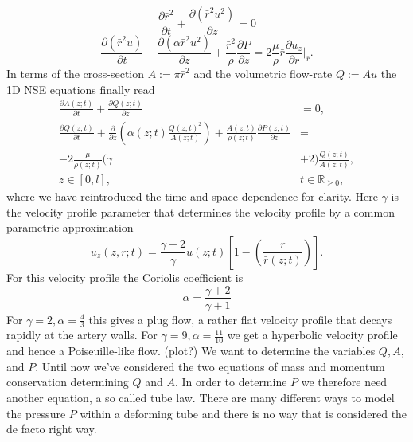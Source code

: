 \documentclass[a4paper, oneside]{discothesis}
\begin{document}
\begin{equation}
	\frac{\partial \bar{r}^2}{\partial t} + \frac{\partial (\bar{r}^2 u^2)}{\partial z} = 0
\end{equation}
\begin{equation}
	\frac{\partial (\bar{r}^2 u)}{\partial t} + \frac{\partial (\alpha \bar{r}^2 u^2) }{\partial z} + \frac{\bar{r}^2}{\rho} \frac{\partial P}{\partial z} = 2 \frac{\mu}{\rho} \bar{r} \frac{\partial u_z}{\partial r} |_{\bar{r}}.
\end{equation}
In terms of the cross-section $A := \pi \bar{r}^2$ and the volumetric flow-rate $Q := Au$ the 1D NSE equations finally read
\begin{equation}
	\begin{aligned} 
		\frac{\partial A(z;t)}{\partial t} + \frac{\partial Q(z;t)}{\partial z} &= 0, \\ 
		\frac{\partial Q(z;t)}{\partial t} + \frac{\partial}{\partial z}\left(\alpha(z;t) \frac{Q(z;t)^2}{A(z;t)} \right) + \frac{A(z;t)}{\rho(z;t)} \frac{\partial P(z;t)}{\partial z} &= \\
		-2 \frac{\mu}{\rho(z;t)} ( \gamma &+ 2 ) \frac{Q(z;t)}{A(z;t)}, \\
		z \in [0,l],\ & t \in \mathbb{R}_{\geq 0}, 
	\end{aligned} \label{eq:1Deqs1}
\end{equation}
where we have reintroduced the time and space dependence for clarity.
Here $\gamma$ is the velocity profile parameter that determines the velocity profile by a common parametric approximation 
\begin{equation}
	u_z(z,r;t) = \frac{\gamma + 2}{\gamma} u(z;t) \left[ 1 - \left( \frac{r}{\bar{r}(z;t)} \right) \right].
\end{equation}
For this velocity profile the Coriolis coefficient is
\begin{equation}
	\alpha = \frac{\gamma + 2}{\gamma + 1}
\end{equation}
For $\gamma=2, \alpha = \frac{4}{3}$ this gives a plug flow, a rather flat velocity profile that decays rapidly at the artery walls.
For $\gamma=9, \alpha = \frac{11}{10} $ we get a hyperbolic velocity profile and hence a Poiseuille-like flow. (plot?)\cite{köppl2023dimension} \cite{barnard1966theory}
We want to determine the variables $Q, A,$ and $P$.
Until now we've considered the two equations of mass and momentum conservation determining $Q$ and $A$.
In order to determine $P$ we therefore need another equation, a so called tube law.
There are many different ways to model the pressure $P$ within a deforming tube and there is no way that is considered the de facto right way.
\end{document}
